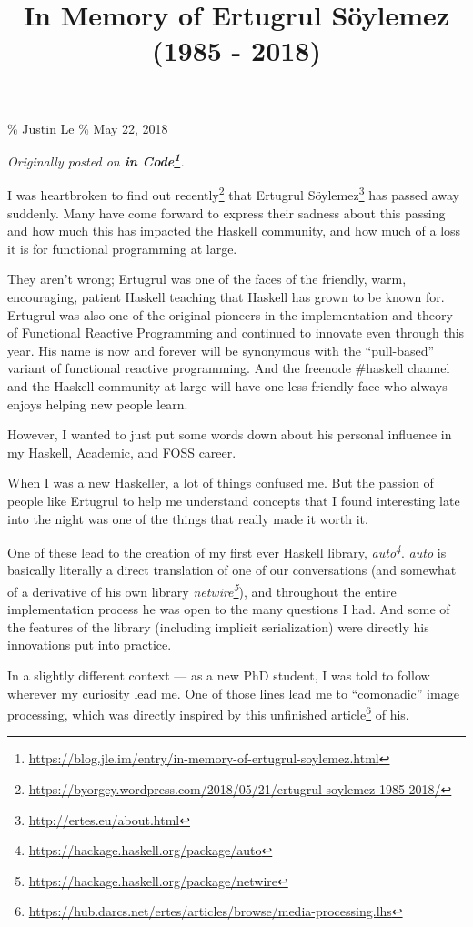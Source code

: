 \documentclass[]{article}
\title{In Memory of Ertugrul Söylemez (1985 - 2018)}
\renewcommand{\href}[2]{#2\footnote{\url{#1}}}
\begin{document}
\maketitle

\% Justin Le \% May 22, 2018

\emph{Originally posted on
\textbf{\href{https://blog.jle.im/entry/in-memory-of-ertugrul-soylemez.html}{in
Code}}.}

I was heartbroken to
\href{https://byorgey.wordpress.com/2018/05/21/ertugrul-soylemez-1985-2018/}{find
out recently} that \href{http://ertes.eu/about.html}{Ertugrul Söylemez} has
passed away suddenly. Many have come forward to express their sadness about this
passing and how much this has impacted the Haskell community, and how much of a
loss it is for functional programming at large.

They aren't wrong; Ertugrul was one of the faces of the friendly, warm,
encouraging, patient Haskell teaching that Haskell has grown to be known for.
Ertugrul was also one of the original pioneers in the implementation and theory
of Functional Reactive Programming and continued to innovate even through this
year. His name is now and forever will be synonymous with the ``pull-based''
variant of functional reactive programming. And the freenode \#haskell channel
and the Haskell community at large will have one less friendly face who always
enjoys helping new people learn.

However, I wanted to just put some words down about his personal influence in my
Haskell, Academic, and FOSS career.

When I was a new Haskeller, a lot of things confused me. But the passion of
people like Ertugrul to help me understand concepts that I found interesting
late into the night was one of the things that really made it worth it.

One of these lead to the creation of my first ever Haskell library,
\emph{\href{https://hackage.haskell.org/package/auto}{auto}}. \emph{auto} is
basically literally a direct translation of one of our conversations (and
somewhat of a derivative of his own library
\emph{\href{https://hackage.haskell.org/package/netwire}{netwire}}), and
throughout the entire implementation process he was open to the many questions I
had. And some of the features of the library (including implicit serialization)
were directly his innovations put into practice.

In a slightly different context --- as a new PhD student, I was told to follow
wherever my curiosity lead me. One of those lines lead me to ``comonadic'' image
processing, which was directly inspired by
\href{https://hub.darcs.net/ertes/articles/browse/media-processing.lhs}{this
unfinished article} of his.
\end{document}
